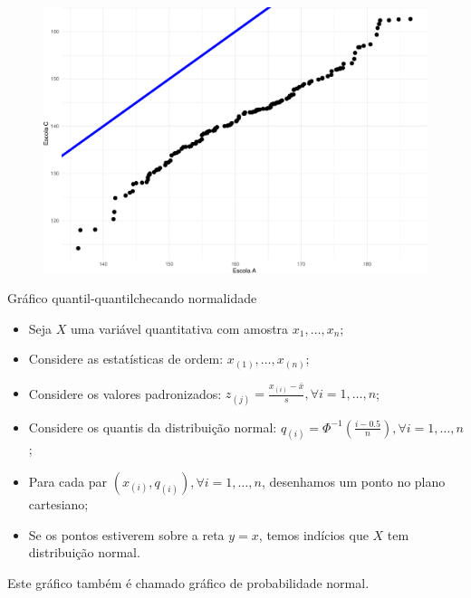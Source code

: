 \documentclass[
  10pt,
  ignorenonframetext,
]{beamer}
\providecommand{\tightlist}{%
  \setlength{\itemsep}{0pt}\setlength{\parskip}{0pt}}\usepackage{longtable,booktabs,array}
\begin{document}
\begin{frame}
\begin{figure}

{\centering \includegraphics[width=1\textwidth,height=\textheight]{exploracao-visualizacao_files/figure-beamer/unnamed-chunk-122-1.pdf}

}

\end{figure}
\end{frame}

\begin{frame}{Gráfico quantil-quantil\newline checando normalidade}
\protect\hypertarget{gruxe1fico-quantil-quantilchecando-normalidade}{}
\begin{itemize}
\tightlist
\item
  Seja \(X\) uma variável quantitativa com amostra \(x_1, \dots, x_n\);
\item
  Considere as estatísticas de ordem: \(x_{(1)}, \dots, x_{(n)}\);
\item
  Considere os valores padronizados:
  \(z_{(j)} = \frac{x_{(i)} - \bar{x}}{s}, \forall i=1, \dots, n\);
\item
  Considere os quantis da distribuição normal:
  \(q_{(i)} = \Phi^{-1} \left( \frac{i-0.5}{n} \right), \forall i=1, \dots, n\);
\item
  Para cada par \((x_{(i)}, q_{(i)}), \forall i=1, \dots,n\), desenhamos
  um ponto no plano cartesiano;
\item
  Se os pontos estiverem sobre a reta \(y=x\), temos indícios que \(X\)
  tem distribuição normal.
\end{itemize}

Este gráfico também é chamado
\textcolor{titulo}{gráfico de probabilidade normal}.
\end{frame}
\end{document}
